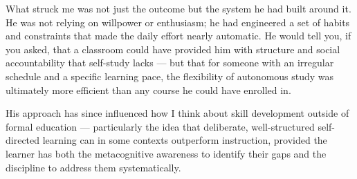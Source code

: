 \begin{ieltsanswer}
What struck me was not just the outcome but the system he had built around it. He was not relying on willpower or enthusiasm; he had engineered a set of habits and constraints that made the daily effort nearly automatic. He would tell you, if you asked, that a classroom could have provided him with structure and social accountability that self-study lacks — but that for someone with an irregular schedule and a specific learning pace, the flexibility of autonomous study was ultimately more efficient than any course he could have enrolled in.

His approach has since influenced how I think about skill development outside of formal education — particularly the idea that deliberate, well-structured self-directed learning can in some contexts outperform instruction, provided the learner has both the metacognitive awareness to identify their gaps and the discipline to address them systematically.
\end{ieltsanswer}


